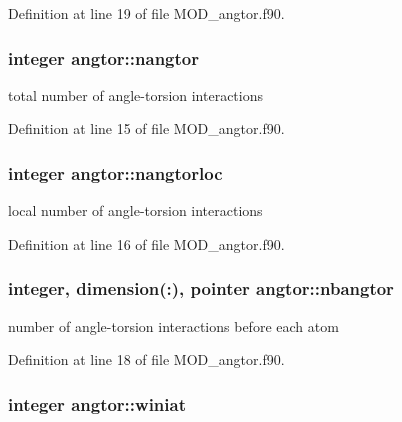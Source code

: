 Definition at line 19 of file M\-O\-D\-\_\-angtor.\-f90.

\hypertarget{classangtor_ab2d904f07d61c24e703df88e353cfb80}{
\subsubsection[{nangtor}]{\setlength{\rightskip}{0pt plus 5cm}integer angtor\-::nangtor}}\label{classangtor_ab2d904f07d61c24e703df88e353cfb80}


total number of angle-\/torsion interactions 



Definition at line 15 of file M\-O\-D\-\_\-angtor.\-f90.

\hypertarget{classangtor_ab216731119c8bc414c28abe37fca62f3}{
\subsubsection[{nangtorloc}]{\setlength{\rightskip}{0pt plus 5cm}integer angtor\-::nangtorloc}}\label{classangtor_ab216731119c8bc414c28abe37fca62f3}


local number of angle-\/torsion interactions 



Definition at line 16 of file M\-O\-D\-\_\-angtor.\-f90.

\hypertarget{classangtor_aa08cce1ef8c68fdd3aaeb4798cefc3ee}{
\subsubsection[{nbangtor}]{\setlength{\rightskip}{0pt plus 5cm}integer, dimension(\-:), pointer angtor\-::nbangtor}}\label{classangtor_aa08cce1ef8c68fdd3aaeb4798cefc3ee}


number of angle-\/torsion interactions before each atom 



Definition at line 18 of file M\-O\-D\-\_\-angtor.\-f90.

\hypertarget{classangtor_a0be3fa8ffc98e957dfb888166803bef9}{
\subsubsection[{winiat}]{\setlength{\rightskip}{0pt plus 5cm}integer angtor\-::winiat}}\label{classangtor_a0be3fa8ffc98e957dfb888166803bef9}


